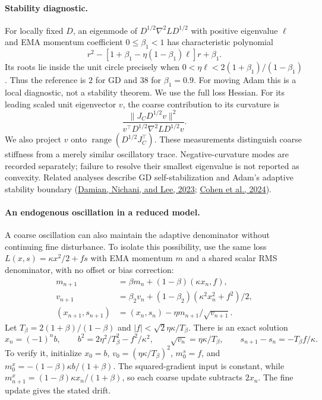 \paragraph{Stability diagnostic.}
For locally fixed $D$, an eigenmode of $D^{1/2}\nabla^2L D^{1/2}$ with
positive eigenvalue $\ell$ and EMA momentum coefficient $0\le\beta_1<1$ has
characteristic polynomial
\[
 r^2-[1+\beta_1-\eta(1-\beta_1)\ell]r+\beta_1.
\]
Its roots lie inside the unit circle precisely when
$0<\eta\ell<2(1+\beta_1)/(1-\beta_1)$.
Thus the reference is $2$ for GD and $38$ for $\beta_1=0.9$.
For moving Adam this is a local diagnostic, not a stability theorem.
We use the full loss Hessian. For its leading scaled unit eigenvector $v$,
the coarse contribution to its curvature is
\[
 \frac{\|J_CD^{1/2}v\|^2}
 {v^\top D^{1/2}\nabla^2L D^{1/2}v}.
\]
We also project $v$ onto $\operatorname{range}(D^{1/2}J_C^\top)$.
These measurements distinguish coarse stiffness from a merely similar
oscillatory trace. Negative-curvature modes are recorded separately;
failure to resolve their smallest eigenvalue is not reported as convexity.
Related analyses describe GD self-stabilization and Adam's adaptive
stability boundary
(\href{https://arxiv.org/abs/2209.15594}{Damian, Nichani, and Lee, 2023};
\href{https://arxiv.org/abs/2207.14484}{Cohen et al., 2024}).

\paragraph{An endogenous oscillation in a reduced model.}
A coarse oscillation can also maintain the adaptive denominator without
continuing fine disturbance. To isolate this possibility, use the same
loss $L(x,s)=\kappa x^2/2+fs$ with EMA momentum $m$ and a shared scalar
RMS denominator, with no offset or bias correction:
\begin{align*}
 m_{n+1}&=\beta m_n+(1-\beta)(\kappa x_n,f),\\
 v_{n+1}&=\beta_2v_n+(1-\beta_2)(\kappa^2x_n^2+f^2)/2,\\
 (x_{n+1},s_{n+1})&=(x_n,s_n)-\eta m_{n+1}/\sqrt{v_{n+1}}.
\end{align*}
Let $T_\beta=2(1+\beta)/(1-\beta)$ and
$|f|<\sqrt2\eta\kappa/T_\beta$. There is an exact solution
\[
 x_n=(-1)^n b,\qquad
 b^2=2\eta^2/T_\beta^2-f^2/\kappa^2,\qquad
 \sqrt{v_n}=\eta\kappa/T_\beta,\qquad
 s_{n+1}-s_n=-T_\beta f/\kappa.
\]
To verify it, initialize $x_0=b$, $v_0=(\eta\kappa/T_\beta)^2$,
$m_0^s=f$, and $m_0^x=-(1-\beta)\kappa b/(1+\beta)$.
The squared-gradient input is constant, while
$m_{n+1}^x=(1-\beta)\kappa x_n/(1+\beta)$, so each coarse update
subtracts $2x_n$. The fine update gives the stated drift.

